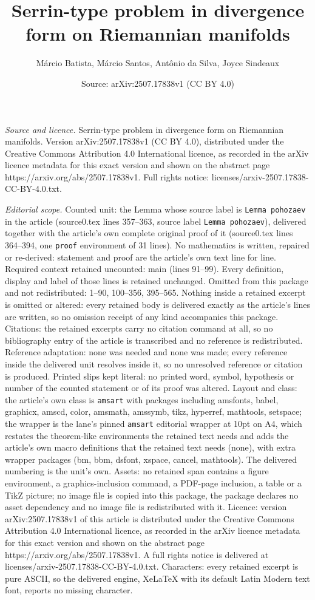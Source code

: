 \documentclass[10pt,a4paper]{amsart}
\title[Serrin-type problem in divergence form on Riemannian manifol]{Serrin-type problem in divergence form on Riemannian manifolds}
\author{M\'arcio Batista, M\'arcio Santos, Ant\^onio da Silva, Joyce Sindeaux}
\date{Source: arXiv:2507.17838v1 (CC BY 4.0)}
\begin{document}
\maketitle

\noindent\emph{Source and licence.} Serrin-type problem in divergence form on Riemannian manifolds. Version arXiv:2507.17838v1 (CC BY 4.0), distributed under the Creative Commons Attribution 4.0 International licence, as recorded in the arXiv licence metadata for this exact version and shown on the abstract page https://arxiv.org/abs/2507.17838v1. Full rights notice: licenses/arxiv-2507.17838-CC-BY-4.0.txt.\par\smallskip

\noindent\textit{Editorial scope.} Counted unit: the Lemma whose source label is \texttt{Lemma pohozaev} in the article (source0.tex lines 357--363, source label \texttt{Lemma pohozaev}), delivered together with the article's own complete original proof of it (source0.tex lines 364--394, one \texttt{proof} environment of 31 lines). No mathematics is written, repaired or re-derived: statement and proof are the article's own text line for line. Required context retained uncounted: main (lines 91--99). Every definition, display and label of those lines is retained unchanged. Omitted from this package and not redistributed: 1--90, 100--356, 395--565. Nothing inside a retained excerpt is omitted or altered: every retained body is delivered exactly as the article's lines are written, so no omission receipt of any kind accompanies this package. Citations: the retained excerpts carry no citation command at all, so no bibliography entry of the article is transcribed and no reference is redistributed. Reference adaptation: none was needed and none was made; every reference inside the delivered unit resolves inside it, so no unresolved reference or citation is produced. Printed slips kept literal: no printed word, symbol, hypothesis or number of the counted statement or of its proof was altered. Layout and class: the article's own class is \texttt{amsart} with packages including amsfonts, babel, graphicx, amscd, color, amsmath, amssymb, tikz, hyperref, mathtools, setspace; the wrapper is the lane's pinned \texttt{amsart} editorial wrapper at 10pt on A4, which restates the theorem-like environments the retained text needs and adds the article's own macro definitions that the retained text needs (none), with extra wrapper packages (bm, bbm, dsfont, xspace, cancel, mathtools). The delivered numbering is the unit's own. Assets: no retained span contains a figure environment, a graphics-inclusion command, a PDF-page inclusion, a table or a TikZ picture; no image file is copied into this package, the package declares no asset dependency and no image file is redistributed with it. Licence: version arXiv:2507.17838v1 of this article is distributed under the Creative Commons Attribution 4.0 International licence, as recorded in the arXiv licence metadata for this exact version and shown on the abstract page https://arxiv.org/abs/2507.17838v1. A full rights notice is delivered at licenses/arxiv-2507.17838-CC-BY-4.0.txt. Characters: every retained excerpt is pure ASCII, so the delivered engine, XeLaTeX with its default Latin Modern text font, reports no missing character.
\end{document}
